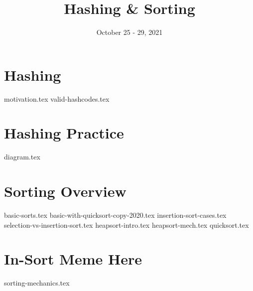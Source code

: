 \documentclass[11pt]{exam}
\title{Hashing \& Sorting}
\date{October 25 - 29, 2021}
\begin{document}
\maketitle

\section{Hashing}
\begin{questions}
{motivation.tex}
\clearpage
{valid-hashcodes.tex}
\end{questions}
\clearpage

\section{Hashing Practice}
\begin{questions}
{diagram.tex}
\end{questions}
\clearpage

\section{Sorting Overview}
\begin{questions}
{basic-sorts.tex}
{basic-with-quicksort-copy-2020.tex}
{insertion-sort-cases.tex}
\vspace{15mm}
{selection-vs-insertion-sort.tex}
\vspace{15mm}
{heapsort-intro.tex}
\vspace{20mm}
{heapsort-mech.tex}
\vspace{20mm}
{quicksort.tex}
\end{questions}
\clearpage

\section{In-Sort Meme Here}
\begin{questions}
{sorting-mechanics.tex}
\end{questions}
\clearpage


\clearpage
\end{document}

